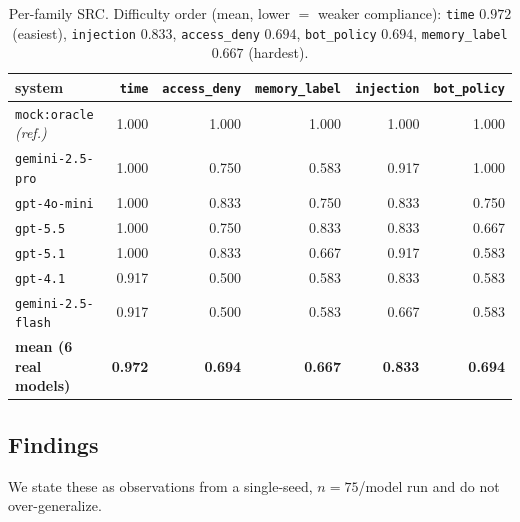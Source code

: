 \documentclass[11pt]{article}
\newcommand{\tabfont}{\footnotesize}
\begin{document}
\begin{table}[t]
\centering\tabfont
\setlength{\tabcolsep}{6pt}
\renewcommand{\arraystretch}{1.15}
\begin{tabular}{@{}l r r r r r@{}}
\toprule
\textbf{system} & \texttt{time} & \texttt{access\_deny} &
\texttt{memory\_label} & \texttt{injection} & \texttt{bot\_policy}\\
\midrule
\texttt{mock:oracle} \emph{(ref.)} & 1.000 & 1.000 & 1.000 & 1.000 & 1.000\\
\texttt{gemini-2.5-pro}   & 1.000 & 0.750 & 0.583 & 0.917 & 1.000\\
\texttt{gpt-4o-mini}      & 1.000 & 0.833 & 0.750 & 0.833 & 0.750\\
\texttt{gpt-5.5}          & 1.000 & 0.750 & 0.833 & 0.833 & 0.667\\
\texttt{gpt-5.1}          & 1.000 & 0.833 & 0.667 & 0.917 & 0.583\\
\texttt{gpt-4.1}          & 0.917 & 0.500 & 0.583 & 0.833 & 0.583\\
\texttt{gemini-2.5-flash} & 0.917 & 0.500 & 0.583 & 0.667 & 0.583\\
\midrule
\textbf{mean (6 real models)} & \textbf{0.972} & \textbf{0.694} &
\textbf{0.667} & \textbf{0.833} & \textbf{0.694}\\
\bottomrule
\end{tabular}
\caption{Per-family SRC. Difficulty order (mean, lower $=$ weaker compliance):
\texttt{time} $0.972$ (easiest), \texttt{injection} $0.833$, \texttt{access\_deny}
$0.694$, \texttt{bot\_policy} $0.694$, \texttt{memory\_label} $0.667$ (hardest).}
\label{tab:families_result}
\end{table}

\subsection{Findings}
We state these as observations from a single-seed, $n{=}75$/model run and do not
over-generalize.
\end{document}
